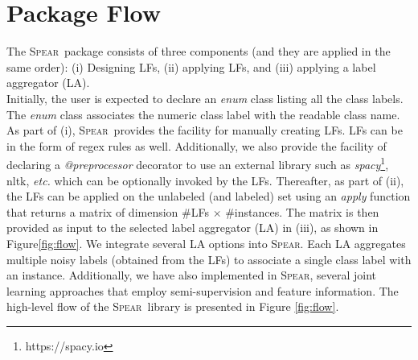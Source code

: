 \documentclass[11pt]{article}
\newcommand{\spear}{\mbox{\textsc{Spear}}}
\begin{document}
\section{Package Flow}
The \spear\ package consists of three components (and they are applied in the same order): (i) Designing LFs, (ii) applying LFs, and (iii) applying a label aggregator (LA). \\
Initially, the user is expected to declare an \textit{enum} class listing all the class labels. The \textit{enum} class associates the numeric class label with the readable class name.
As part of (i), \spear\ provides the facility for manually creating LFs. LFs can be in the form of regex rules as well. Additionally, we also provide the facility of declaring a \textit{@preprocessor} decorator to use an external library such as \textit{spacy}\footnote{https://spacy.io}, nltk, {\em{etc.}} which can be optionally invoked by the LFs.
Thereafter, as part of (ii), the LFs can be applied on the unlabeled (and labeled) set using an \textit{apply} function that returns a matrix of dimension \#LFs $\times$ \#instances.
The matrix is then provided as input to the selected label aggregator (LA)  in (iii), as shown in Figure\ref{fig:flow}.
We integrate several LA options into \spear. Each LA aggregates multiple noisy labels (obtained from the LFs) to associate a single class label with an instance. Additionally, we have also implemented in \spear, several joint learning approaches that employ semi-supervision and feature information.
The high-level flow of the \spear\ library is presented in Figure \ref{fig:flow}.
\end{document}
